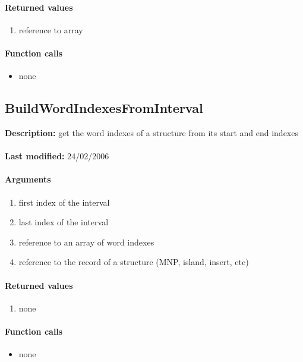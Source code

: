 \paragraph{Returned values}
\begin{enumerate}
\item reference to array
\end{enumerate}

\paragraph{Function calls}
\begin{itemize}
\item none
\end{itemize}

\subsection{BuildWordIndexesFromInterval}
\textbf{Description:} get the word indexes of a structure from its start and end indexes\\
\\\textbf{Last modified:} 24/02/2006

\paragraph{Arguments}
\begin{enumerate}
\item first index of the interval
\item last index of the interval
\item reference to an array of word indexes
\item reference to the record of a structure (MNP, island, insert, etc)
\end{enumerate}

\paragraph{Returned values}
\begin{enumerate}
\item none
\end{enumerate}

\paragraph{Function calls}
\begin{itemize}
\item none
\end{itemize}

